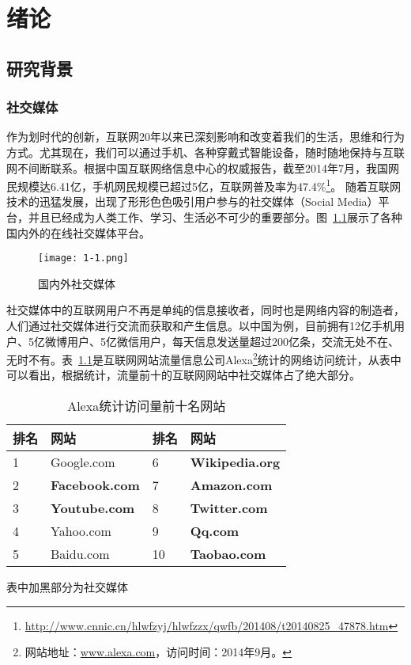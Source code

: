 \chapter{绪论}
\label{Intro}

\section{研究背景}

\subsection{社交媒体}
作为划时代的创新，互联网20年以来已深刻影响和改变着我们的生活，思维和行为方式。尤其现在，我们可以通过手机、各种穿戴式智能设备，随时随地保持与互联网不间断联系。根据中国互联网络信息中心的权威报告，截至2014年7月，我国网民规模达6.41亿，手机网民规模已超过5亿，互联网普及率为47.4\%\footnote{\url{http://www.cnnic.cn/hlwfzyj/hlwfzzx/qwfb/201408/t20140825\_47878.htm}}。
随着互联网技术的迅猛发展，出现了形形色色吸引用户参与的社交媒体（Social Media）平台，并且已经成为人类工作、学习、生活必不可少的重要部分。图~\ref{fig1-1}展示了各种国内外的在线社交媒体平台。

\begin{figure}[htp]
\centering
\texttt{[image: 1-1.png]}
\caption{国内外社交媒体}
\label{fig1-1}
\end{figure}

社交媒体中的互联网用户不再是单纯的信息接收者，同时也是网络内容的制造者，人们通过社交媒体进行交流而获取和产生信息。以中国为例，目前拥有12亿手机用户、5亿微博用户、5亿微信用户，每天信息发送量超过200亿条，交流无处不在、无时不有。表~\ref{tab1-1}是互联网网站流量信息公司Alexa\footnote{网站地址：\url{www.alexa.com}，访问时间：2014年9月。}统计的网络访问统计，从表中可以看出，根据统计，流量前十的互联网网站中社交媒体占了绝大部分。

\begin{table}[htp]
\centering
\caption{Alexa统计访问量前十名网站}
\label{tab1-1}
\begin{threeparttable}
 \begin{tabular}{|l|l|l|l|}
 \hline
 排名&网站&排名&网站\\
 \hline
 1& Google.com& 6&\textbf{ Wikipedia.org\tnote{1}}\\
 2& \textbf{Facebook.com}& 7& \textbf{Amazon.com}\\
 3& \textbf{Youtube.com}& 8& \textbf{Twitter.com}\\
 4& Yahoo.com& 9& \textbf{Qq.com}\\
 5& Baidu.com& 10& \textbf{Taobao.com}\\
 \hline
\end{tabular}
\begin{tablenotes}
  \centering
  \footnotesize
\item[1]表中加黑部分为社交媒体
\end{tablenotes}
\end{threeparttable}
\end{table}

